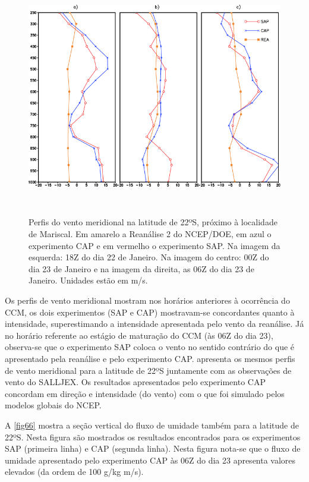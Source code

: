 \begin{figure}[!hpb]
\centering
\includegraphics[height=10.5cm]{./figs/perf_vert_vento.png}
\caption{Perfis do vento meridional na latitude de 22ºS, próximo à localidade de Mariscal. Em amarelo a Reanálise 2 do NCEP/DOE, em azul o experimento CAP e em vermelho o experimento SAP. Na imagem da esquerda: 18Z do dia 22 de Janeiro. Na imagem do centro: 00Z do dia 23 de Janeiro e na imagem da direita, as 06Z do dia 23 de Janeiro. Unidades estão em m/s.}
\label{fig65}
\end{figure}

Os perfis de vento meridional mostram nos horários anteriores à ocorrência do CCM, os dois experimentos (SAP e CAP) mostravam-se concordantes quanto à intensidade, superestimando a intensidade apresentada pelo vento da reanálise. Já no horário referente ao estágio de maturação do CCM (às 06Z do dia 23), observa-se que o experimento SAP coloca o vento no sentido contrário do que é apresentado pela reanálise e pelo experimento CAP.  apresenta os mesmos perfis de vento meridional para a latitude de 22ºS juntamente com as observações de vento do SALLJEX. Os resultados apresentados pelo experimento CAP concordam em direção e intensidade (do vento) com o que foi simulado pelos modelos globais do NCEP.

A \autoref{fig66} mostra a seção vertical do fluxo de umidade também para a latitude de 22ºS. Nesta figura são mostrados os resultados encontrados para os experimentos SAP (primeira linha) e CAP (segunda linha). Nesta figura nota-se que o fluxo de umidade apresentado pelo experimento CAP às 06Z do dia 23 apresenta valores elevados (da ordem de 100 g/kg m/s).

